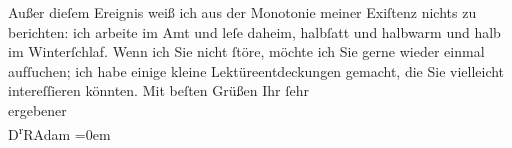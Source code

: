 \begin{ledgroupsized}[t]{13cm}
           Außer dieſem Ereignis weiß ich aus der Monotonie meiner Exiſtenz nichts zu
                    berichten: ich arbeite im Amt und leſe daheim, halbſatt und halbwarm und halb im
                    Winterſchlaf.\pend
           \pstart
           Wenn ich Sie nicht ſtöre, möchte ich Sie gerne wieder einmal aufſuchen; ich habe
                    einige kleine Lektüreentdeckungen gemacht, die Sie vielleicht intereſſieren
                    könnten.\pend
           \pstart
           Mit beſten Grüßen Ihr ſehr{\\[\baselineskip]}ergebener{\\[\baselineskip]}\spacefill\mbox{D\textsuperscript{r}RAdam}\pend
           \leftskip=0em{}
         
         \endnumbering{}\end{ledgroupsized}  \newcommand{\dateiname}{L02319}\newcommand{\titel}{Robert Adam an Arthur Schnitzler, 17. 1. 1919}\newcommand{\editorInnen}{Martin Anton Müller und Gerd-Hermann Susen}
      